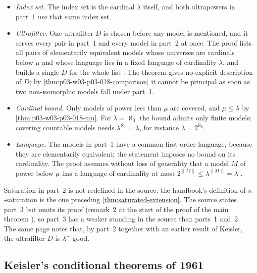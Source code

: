 \begin{itemize}
  \item \emph{Index set.}  The index set is the cardinal \(\lambda\) itself,
        and both ultrapowers in part~1 use that same index set.
  \item \emph{Ultrafilter.}  One ultrafilter \(D\) is chosen before any model
        is mentioned, and it serves every pair in part~1 and every model in
        part~2 at once.  The proof lists all pairs of elementarily
        equivalent models whose universes are cardinals below \(\mu\) and
        whose language lies in a fixed language of cardinality \(\lambda\),
        and builds a single \(D\) for the whole list
        \cite[230]{Shelah1971Ultrapowers}.  The theorem gives no explicit
        description of \(D\); by
        \cref{thm:p03-w03-p03-018-comparison} it cannot be principal as soon
        as two non-isomorphic models fall under part~1.
  \item \emph{Cardinal bound.}  Only models of power less than \(\mu\) are
        covered, and \(\mu\le\lambda\) by
        \cref{thm:p03-w03-p03-018-mu}.  For \(\lambda=\aleph_0\) the bound
        admits only finite models; covering countable models needs
        \(\lambda^{\aleph_0}=\lambda\), for instance
        \(\lambda=2^{\aleph_0}\).
  \item \emph{Language.}  The models in part~1 have a common first-order
        language, because they are elementarily equivalent; the statement
        imposes no bound on its cardinality.  The proof assumes without loss
        of generality that a model \(M\) of power below \(\mu\) has a
        language of cardinality at most
        \(2^{\lVert M\rVert}\le\lambda^{\lVert M\rVert}=\lambda\)
        \cite[230]{Shelah1971Ultrapowers}.
\end{itemize}

Saturation in part~2 is not redefined in the source; the handbook's
definition of \(\kappa\)-saturation is the one preceding
\cref{thm:saturated-extension}.  The source states part~3 but omits its
proof (remark~2 at the start of the proof of the main theorem
\cite[230]{Shelah1971Ultrapowers}), so part~3 has a weaker standing in the
source than parts~1 and~2.  The same page notes that, by part~2 together with
an earlier result of Keisler, the ultrafilter \(D\) is \(\lambda^+\)-good.

\subsection{Keisler's conditional theorems of 1961}
\label{sec:p03-w03-p03-018-keisler}

